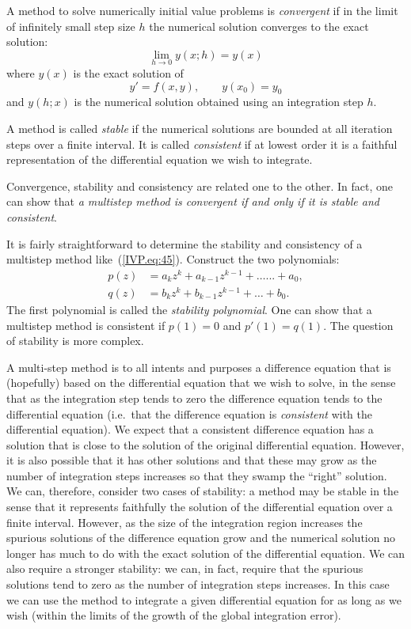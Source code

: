 A method to solve numerically initial value problems is
\textit{convergent} if in the limit of infinitely small step size $h$
the numerical solution converges to the exact solution:
%
\begin{equation}
  \lim_{h \to 0} y(x;h) = y(x)
\end{equation}
%
where $y(x)$ is the exact solution of
%
\begin{equation}
  y' = f(x,y), \qquad y(x_0) = y_0
\end{equation}
%
and $y(h;x)$ is the numerical solution obtained using an integration
step $h$.

A method is called \textit{stable} if the numerical solutions are
bounded at all iteration steps over a finite interval.  It is called
\textit{consistent} if at lowest order it is a faithful representation
of the differential equation we wish to integrate.

Convergence, stability and consistency are related one to the other.
In fact, one can show that \textit{a multistep method is convergent if
  and only if it is stable and consistent}.

It is fairly straightforward to determine the stability and
consistency of a multistep method like~(\ref{IVP.eq:45}).  Construct
the two polynomials:
%
\begin{align}
  p(z) &= a_k z^k + a_{k-1} z^{k-1} + \ldots ... + a_0,
  \label{IVP.eq:47} \\
  q(z) &= b_k z^k + b_{k-1} z^{k-1} + \ldots + b_0. \label{IVP.eq:48}
\end{align}
%
The first polynomial is called the \textit{stability polynomial}.  One
can show that a multistep method is consistent if $p(1)=0$ and
$p'(1)=q(1)$.  The question of stability is more complex.

A multi-step method is to all intents and purposes a difference
equation that is (hopefully) based on the differential equation that
we wish to solve, in the sense that as the integration step tends to
zero the difference equation tends to the differential equation
(i.e.\ that the difference equation is \textit{consistent} with the
differential equation).  We expect that a consistent difference
equation has a solution that is close to the solution of the original
differential equation.  However, it is also possible that it has other
solutions and that these may grow as the number of integration steps
increases so that they swamp the ``right'' solution.  We can,
therefore, consider two cases of stability: a method may be stable in
the sense that it represents faithfully the solution of the
differential equation over a finite interval.  However, as the size of
the integration region increases the spurious solutions of the
difference equation grow and the numerical solution no longer has much
to do with the exact solution of the differential equation.  We can
also require a stronger stability: we can, in fact, require that the
spurious solutions tend to zero as the number of integration steps
increases.  In this case we can use the method to integrate a given
differential equation for as long as we wish (within the limits of the
growth of the global integration error).

